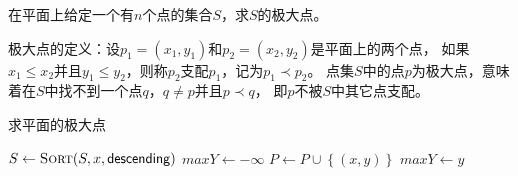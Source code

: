 \documentclass[answers]{exam}
\begin{document}
\begin{questions}
    \question 在平面上给定一个有$n$个点的集合$S$，求$S$的极大点。

    极大点的定义：设$p_1=(x_1,y_1)$和$p_2=(x_2,y_2)$是平面上的两个点，
    如果$x_1 \le x_2$并且$y_1 \le y_2$，则称$p_2$支配$p_1$，记为$p_1 \prec p_2$。
    点集$S$中的点$p$为极大点，意味着在$S$中找不到一个点$q$，$q \ne p$并且$p \prec q$，
    即$p$不被$S$中其它点支配。

    \begin{solution}

        \begin{algorithm}[H]
            \caption{求平面的极大点}
            \begin{algorithmic}[1]
                \State $S \gets \Call{Sort}{S, x, \mathsf{descending}}$ 
                \State $maxY \gets - \infty$
                 
                 
                \State $P \gets P \cup \left\{ (x,y) \right\}$
                \State $maxY \gets y$
                \Else
                \Statex {}
                \EndIf
                \EndFor
            \end{algorithmic}
        \end{algorithm}

    \end{solution}

\end{questions}
\end{document}
